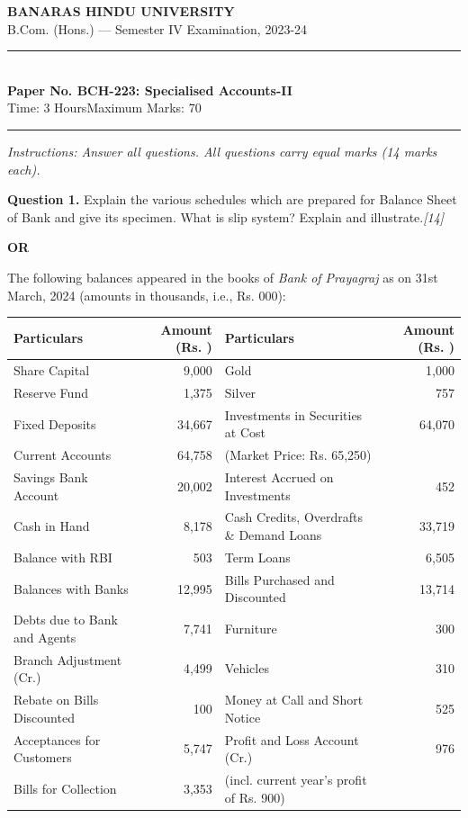 \documentclass[11pt,a4paper]{article}
\newcommand{\pts}[1]{\hfill   \textit{[#1]}}
\begin{document}
\begin{center}
  {\large\bfseries BANARAS HINDU UNIVERSITY}\\[2pt]
  {\normalsize B.Com. (Hons.) --- Semester IV Examination, 2023-24}\\[6pt]
  \rule{0.8\linewidth}{0.5pt}\\[6pt]
  {\large\bfseries Paper No. BCH-223: Specialised Accounts-II}\\[4pt]
  {\normalsize Time: 3 Hours\hfill Maximum Marks: 70}
\end{center}

\rule{\linewidth}{0.4pt}

\smallskip



\noindent   \textit{Instructions: Answer all questions. All questions carry equal marks (14 marks each).}

\bigskip




\noindent   \textbf{Question 1.}
Explain the various schedules which are prepared for Balance Sheet of Bank and give its specimen. What is slip system? Explain and illustrate.\pts{14}

\centerline{   \textbf{OR}}

The following balances appeared in the books of   \textit{Bank of Prayagraj} as on 31st March, 2024 (amounts in thousands, i.e., Rs. 000):


\begin{center}
\small

\begin{tabular}{|l|r||l|r|}
\hline
   \textbf{Particulars} &   \textbf{Amount (Rs. )} &   \textbf{Particulars} &   \textbf{Amount (Rs. )} \\
\hline
Share Capital & 9,000 & Gold & 1,000 \\
Reserve Fund & 1,375 & Silver & 757 \\
Fixed Deposits & 34,667 & Investments in Securities at Cost & 64,070 \\
Current Accounts & 64,758 & \quad (Market Price: Rs. 65,250) & \\
Savings Bank Account & 20,002 & Interest Accrued on Investments & 452 \\
Cash in Hand & 8,178 & Cash Credits, Overdrafts \& Demand Loans & 33,719 \\
Balance with RBI & 503 & Term Loans & 6,505 \\
Balances with Banks & 12,995 & Bills Purchased and Discounted & 13,714 \\
Debts due to Bank and Agents & 7,741 & Furniture & 300 \\
Branch Adjustment (Cr.) & 4,499 & Vehicles & 310 \\
Rebate on Bills Discounted & 100 & Money at Call and Short Notice & 525 \\
Acceptances for Customers & 5,747 & Profit and Loss Account (Cr.) & 976 \\
Bills for Collection & 3,353 & \quad (incl. current year's profit of Rs. 900) & \\
\hline
\end{tabular}
\end{center}
\end{document}
